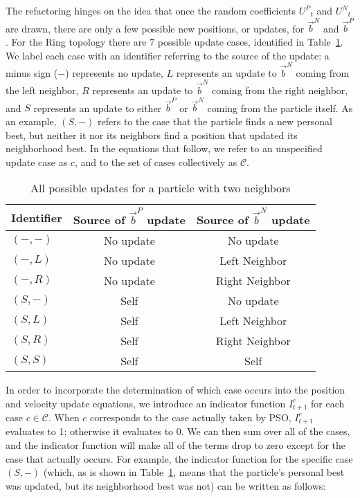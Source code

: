 \documentclass[ms]{byuprop}
\providecommand{\pers}{\ensuremath{P}}
\providecommand{\neigh}{\ensuremath{N}}
\providecommand{\leftind}{\ensuremath{L}}
\providecommand{\rightind}{\ensuremath{R}}
\providecommand{\nURand}{\ensuremath{U^\neigh}}
\providecommand{\pURand}{\ensuremath{U^\pers}}
\providecommand{\nbest}{\ensuremath{\Vec{b}^\neigh}}
\providecommand{\pbest}{\ensuremath{\Vec{b}^\pers}}
\providecommand{\indic}{\ensuremath{I}}
\providecommand{\caseset}{\ensuremath{\mathcal{C}}}
\providecommand{\casegen}{\ensuremath{c}}
\providecommand{\casexn}{\ensuremath{(S,-)}}
\providecommand{\casexx}{\ensuremath{(S,S)}}
\providecommand{\casexl}{\ensuremath{(S,\leftind)}}
\providecommand{\casexr}{\ensuremath{(S,\rightind)}}
\providecommand{\casepn}{\ensuremath{(-,-)}}
\providecommand{\casepl}{\ensuremath{(-,\leftind)}}
\providecommand{\casepr}{\ensuremath{(-,\rightind)}}
\begin{document}
The refactoring hinges on the idea that once the random coefficients
$\pURand_{t}$ and $\nURand_{t}$ are drawn, there are only a few possible new
positions, or updates, for $\nbest$ and $\pbest$.  For the Ring topology there
are 7 possible update cases, identified in Table~\ref{tab:evals}.  We label
each case with an identifier referring to the source of the update: a minus
sign ($-$) represents no update, $L$ represents an update to $\nbest$ coming
from the left neighbor, $R$ represents an update to $\nbest$ coming from the
right neighbor, and $S$ represents an update to either $\pbest$ or $\nbest$
coming from the particle itself.  As an example, $\casexn$ refers to the case
that the particle finds a new personal best, but neither it nor its neighbors
find a position that updated its neighborhood best.  In the equations that
follow, we refer to an unspecified update case as $\casegen$, and to the set of
cases collectively as $\caseset$.

\begin{table}
  \caption{All possible updates for a particle with two neighbors}
  \label{tab:evals}
  \centering
  \begin{tabular}{lcc}
	Identifier&Source of $\pbest$ update&Source of $\nbest$ update\\
	\hline
	\hline
	$\casepn$&No update&No update\\
	\hline
	$\casepl$&No update&Left Neighbor\\
	\hline
	$\casepr$&No update&Right Neighbor\\
	\hline
	$\casexn$&Self&No update\\
	\hline
	$\casexl$&Self&Left Neighbor\\
	\hline
	$\casexr$&Self&Right Neighbor\\
	\hline
	$\casexx$&Self&Self\\
	\hline
  \end{tabular}
\end{table}

In order to incorporate the determination of which case occurs into the
position and velocity update equations, we introduce an indicator function
$\indic_{t+1}^{\casegen}$ for each case $\casegen \in \caseset$.  When
$\casegen$ corresponds to the case actually taken by PSO,
$\indic_{t+1}^{\casegen}$ evaluates to 1; otherwise it evaluates to 0.  We can
then sum over all of the cases, and the indicator function will make all of the
terms drop to zero except for the case that actually occurs.  For example, the
indicator function for the specific case $\casexn$ (which, as is shown in
Table~\ref{tab:evals}, means that the particle's personal best was updated, but
its neighborhood best was not) can be written as follows:
\end{document}
